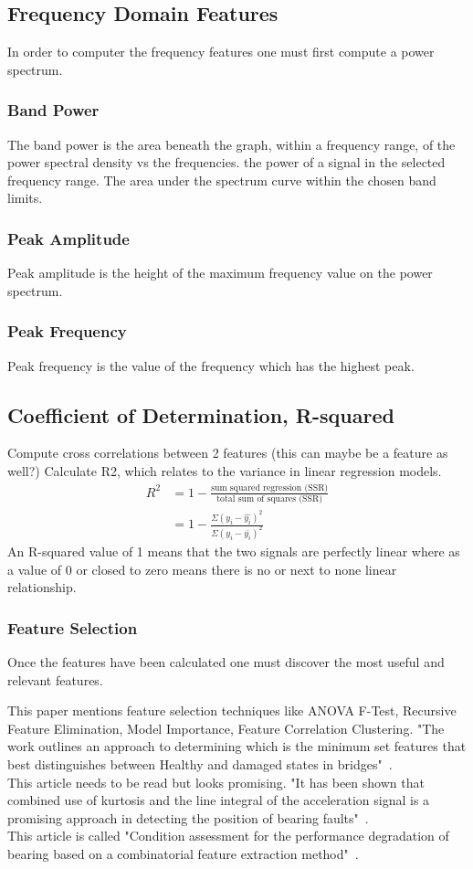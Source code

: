 \documentclass{article}
\begin{document}
\subsection{Frequency Domain Features}
In order to computer the frequency features one must first compute a power spectrum.
\subsubsection{Band Power}
The band power is the area beneath the graph, within a frequency range, of the power spectral density vs the frequencies.
the power of a signal in the selected frequency range.
The area under the spectrum curve within the chosen band limits.
\subsubsection{Peak Amplitude}
Peak amplitude is the height of the maximum frequency value on the power spectrum.
\subsubsection{Peak Frequency}
Peak frequency is the value of the frequency which has the highest peak.

\subsection{Coefficient of Determination, R-squared}
Compute cross correlations between 2 features (this can maybe be a feature as well?)
Calculate R2, which relates to the variance in linear regression models.
\begin{align*}
 R^2 &= 1 - \frac{\textrm{sum squared regression (SSR)}}{\textrm{total sum of squares (SSR)}} \\ 
 &= 1 - \frac{\Sigma(y_i - \hat{y_i})^2}{\Sigma(y_i - \bar{y_i})^2} 
\end{align*}
An R-squared value of 1 means that the two signals are perfectly linear where as a value of 0 or closed to zero means there is no or next to none linear relationship.
\subsubsection{Feature Selection}
Once the features have been calculated one must discover the most useful and relevant features. 

This paper mentions feature selection techniques like ANOVA F-Test, Recursive Feature Elimination, Model Importance, Feature Correlation Clustering. "The work outlines an approach to determining which is the minimum set features that best distinguishes between Healthy and damaged states in bridges"~\cite{buckley2023feature}.\\
This article needs to be read but looks promising. "It has been shown that combined use of kurtosis and the line integral of the acceleration signal is a promising approach in detecting the position of bearing faults"~\cite{kateris2014machine}.\\
This article is called "Condition assessment for the performance degradation of bearing based on a combinatorial feature extraction method"~\cite{hong2014condition}.
\end{document}
